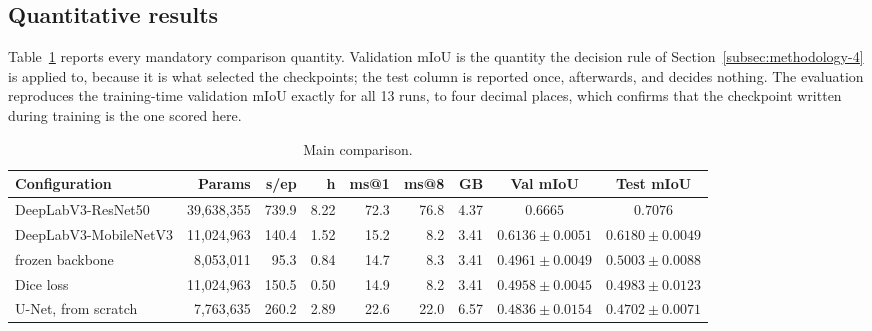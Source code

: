 \subsection{Quantitative results}
\label{subsec:results-2}

Table~\ref{tab:results} reports every mandatory comparison quantity. Validation mIoU is the
quantity the decision rule of Section~\ref{subsec:methodology-4} is applied to, because it is
what selected the checkpoints; the test column is reported once, afterwards, and decides nothing.
The evaluation reproduces the training-time validation mIoU exactly for all 13 runs, to four
decimal places, which confirms that the checkpoint written during training is the one scored
here.

\begin{table}[H]
\centering
\caption{Main comparison.}
\label{tab:results}
\scriptsize
\begin{tabular}{lrrrrrrcc}
\hline
\textbf{Configuration} & \textbf{Params} & \textbf{s/ep} & \textbf{h} & \textbf{ms@1} & \textbf{ms@8} & \textbf{GB} & \textbf{Val mIoU} & \textbf{Test mIoU} \\
\hline
DeepLabV3-ResNet50                & 39{,}638{,}355 & 739.9 & 8.22 & 72.3 & 76.8 & 4.37 & $\mathit{0.6665}$ & $\mathit{0.7076}$ \\
DeepLabV3-MobileNetV3             & 11{,}024{,}963 & 140.4 & 1.52 & 15.2 &  8.2 & 3.41 & $\mathbf{0.6136 \pm 0.0051}$ & $\mathbf{0.6180 \pm 0.0049}$ \\
\quad frozen backbone             &  8{,}053{,}011 &  95.3 & 0.84 & 14.7 &  8.3 & 3.41 & $0.4961 \pm 0.0049$ & $0.5003 \pm 0.0088$ \\
\quad Dice loss                   & 11{,}024{,}963 & 150.5 & 0.50 & 14.9 &  8.2 & 3.41 & $0.4958 \pm 0.0045$ & $0.4983 \pm 0.0123$ \\
U-Net, from scratch               &  7{,}763{,}635 & 260.2 & 2.89 & 22.6 & 22.0 & 6.57 & $0.4836 \pm 0.0154$ & $0.4702 \pm 0.0071$ \\
\hline
\end{tabular}
\end{table}

